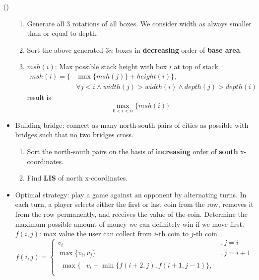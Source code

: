 \begin{theorem}{()}
\begin{itemize}
\begin{enumerate}
            \item Generate all $3$ rotations of all boxes. We consider width as always smaller than or equal to depth.
            \item Sort the above generated $3n$ boxes in \textbf{decreasing} order of \textbf{base area}.
            \item $msh(i)$: Max possible stack height with box $i$ at top of stack. \begin{equation}
                \begin{aligned}
                    msh(i) = \{& \max \{msh(j)\} + height(i)\}, \\ 
                    & \forall j < i \land width(j) > width(i) \land depth(j) > depth(i)
                \end{aligned}
            \end{equation} result is \begin{equation}
                \max_{0 < i < n}\{msh(i)\}
            \end{equation}
        \end{enumerate}
        \item Building bridge: connect as many north-south pairs of cities as possible with bridges such that no two bridges cross. \begin{enumerate}
            \item Sort the north-south pairs on the basis of \textbf{increasing} order of \textbf{south} x-coordinates.
            \item Find \textbf{LIS} of north x-coordinates.
        \end{enumerate}
        \item Optimal strategy: play a game against an opponent by alternating turns. In each turn, a player selects either the first or last coin from the row, removes it from the row permanently, and receives the value of the coin. Determine the maximum possible amount of money we can definitely win if we move first. \\
        $f(i, j)$: max value the user can collect from $i$-th coin to $j$-th coin.\begin{equation}
            f(i, j) = \begin{cases}
                v_i &, j = i \\
                \max\{v_i, v_j\} &, j = i + 1 \\
                \begin{aligned}
                    \max\{& v_i + \min\{f(i + 2, j), f(i + 1, j -1)\}, \\

\end{aligned}
\end{cases}
\end{equation}
\end{itemize}
\end{theorem}
